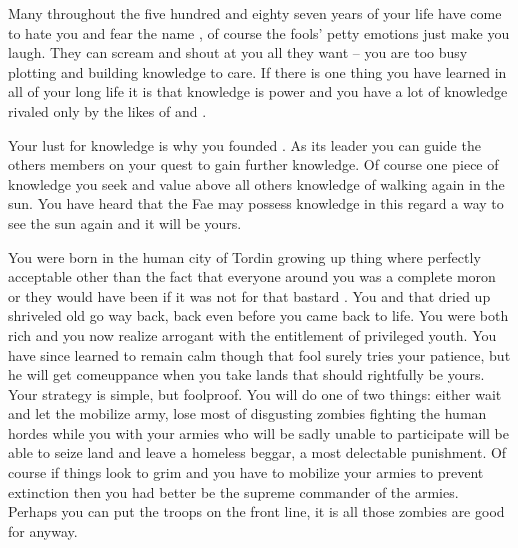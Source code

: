 \documentclass[char]{guildcamp2}
\begin{document}
\name{\cVampire{}}



Many throughout the five hundred and eighty seven years of your life have come to hate you and fear the name \cVampire{}, of course the fools' petty emotions just make you laugh. They can scream and shout at you all they want -- you are too busy plotting and building knowledge to care. If there is one thing you have learned in all of your long life it is that knowledge is power and you have a lot of knowledge rivaled only by the likes of \cDemon{} and \cOnyx{}. 

Your lust for knowledge is why you founded \bLoremasters{}. As its leader you can guide the others members on your quest to gain further knowledge. Of course one piece of knowledge you seek and value above all others knowledge of walking again in the sun.  You have heard that the Fae may possess knowledge in this regard a way to see the sun again and it will be yours.   

You were born in the human city of Tordin growing up thing where perfectly acceptable other than the fact that everyone around you was a complete moron or they would have been if it was not for that bastard \cLich{}. You and that dried up shriveled old \cLich{} go way back, back even before you came back to life. You were both rich and you now realize arrogant with the entitlement of privileged youth. You have since learned to remain calm though that fool \cLich{} surely tries your patience, but he will get \cRed{\their} comeuppance when you take \cRed{\they} lands that should rightfully be yours. Your strategy is simple, but foolproof. You will do one of two things: either wait and let the \cLich{} mobilize \cRed{\their} army, lose most of \cRed{\their} disgusting zombies fighting the human hordes while you with your armies who will be sadly unable to participate will be able to seize \cRed{\their} land and leave \cRed{\them} a homeless beggar, a most delectable punishment. Of course if things look to grim and you have to mobilize your armies to prevent extinction then you had better be the supreme commander of the armies. Perhaps you can put the \cLich{} troops on the front line, it is all those zombies are good for anyway.   
\end{document}
